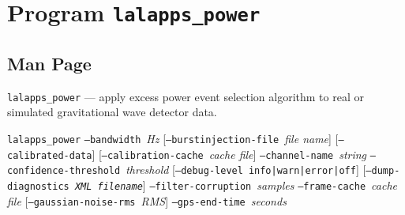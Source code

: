 \documentclass[10pt]{article}
\newcommand{\prog}[1]{\texttt{#1}}
\newcommand{\option}[1]{\texttt{#1}}
\newcommand{\parm}[1]{\textit{#1}}
\newenvironment{entry}%
{\begin{list}{}{\renewcommand{\makelabel}[1]%
{\parbox[b]{\labelwidth}{\makebox[0pt][l]{\textbf{##1}}\\}}%
\setlength{\labelwidth}{1em}%
\setlength{\labelsep}{1em}%
\setlength{\leftmargin}{2em}%
\setlength{\topsep}{\medskipamount}%
\setlength{\itemsep}{\medskipamount}%
\setlength{\parsep}{\medskipamount}%
\setlength{\listparindent}{0pt}}}
{\end{list}}
\begin{document}
\section{Program \prog{lalapps\_power}}


\subsection{Man Page}


\begin{entry}

\item[Name]
\prog{lalapps\_power} --- apply excess power event selection algorithm to
real or simulated gravitational wave detector data.

\item[Synopsis]
\prog{lalapps\_power} \newline \hspace*{0.5in}
\option{--bandwidth}~\parm{Hz} \newline \hspace*{0.5in}
[\option{--burstinjection-file}~\parm{file name}] \newline \hspace*{0.5in}
[\option{--calibrated-data}] \newline \hspace*{0.5in}
[\option{--calibration-cache}~\parm{cache file}] \newline \hspace*{0.5in}
\option{--channel-name}~\parm{string} \newline \hspace*{0.5in}
\option{--confidence-threshold}~\parm{threshold} \newline \hspace*{0.5in}
[\option{--debug-level}~\option{info|warn|error|off}] \newline \hspace*{0.5in}
[\option{--dump-diagnostics~\parm{XML filename}}] \newline \hspace*{0.5in}
\option{--filter-corruption}~\parm{samples} \newline \hspace*{0.5in}
\option{--frame-cache}~\parm{cache file} \newline \hspace*{0.5in}
[\option{--gaussian-noise-rms}~\parm{RMS}] \newline \hspace*{0.5in}
\option{--gps-end-time}~\parm{seconds} \newline \hspace*{0.5in}

\end{entry}
\end{document}
